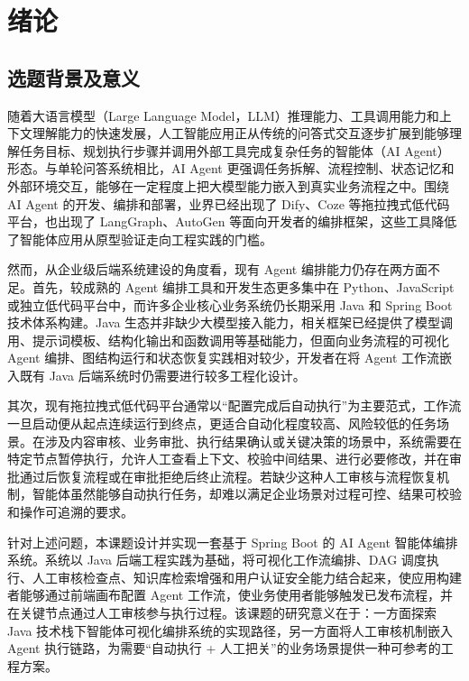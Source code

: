 
\chapter{绪论}

\section{选题背景及意义}

随着大语言模型（Large Language Model，LLM）推理能力、工具调用能力和上下文理解能力的快速发展，人工智能应用正从传统的问答式交互逐步扩展到能够理解任务目标、规划执行步骤并调用外部工具完成复杂任务的智能体（AI Agent）形态。与单轮问答系统相比，AI Agent 更强调任务拆解、流程控制、状态记忆和外部环境交互，能够在一定程度上把大模型能力嵌入到真实业务流程之中。围绕 AI Agent 的开发、编排和部署，业界已经出现了 Dify、Coze 等拖拉拽式低代码平台，也出现了 LangGraph、AutoGen 等面向开发者的编排框架，这些工具降低了智能体应用从原型验证走向工程实践的门槛。

然而，从企业级后端系统建设的角度看，现有 Agent 编排能力仍存在两方面不足。首先，较成熟的 Agent 编排工具和开发生态更多集中在 Python、JavaScript 或独立低代码平台中，而许多企业核心业务系统仍长期采用 Java 和 Spring Boot 技术体系构建。Java 生态并非缺少大模型接入能力，相关框架已经提供了模型调用、提示词模板、结构化输出和函数调用等基础能力，但面向业务流程的可视化 Agent 编排、图结构运行和状态恢复实践相对较少，开发者在将 Agent 工作流嵌入既有 Java 后端系统时仍需要进行较多工程化设计。

其次，现有拖拉拽式低代码平台通常以“配置完成后自动执行”为主要范式，工作流一旦启动便从起点连续运行到终点，更适合自动化程度较高、风险较低的任务场景。在涉及内容审核、业务审批、执行结果确认或关键决策的场景中，系统需要在特定节点暂停执行，允许人工查看上下文、校验中间结果、进行必要修改，并在审批通过后恢复流程或在审批拒绝后终止流程。若缺少这种人工审核与流程恢复机制，智能体虽然能够自动执行任务，却难以满足企业场景对过程可控、结果可校验和操作可追溯的要求。

针对上述问题，本课题设计并实现一套基于 Spring Boot 的 AI Agent 智能体编排系统。系统以 Java 后端工程实践为基础，将可视化工作流编排、DAG 调度执行、人工审核检查点、知识库检索增强和用户认证安全能力结合起来，使应用构建者能够通过前端画布配置 Agent 工作流，使业务使用者能够触发已发布流程，并在关键节点通过人工审核参与执行过程。该课题的研究意义在于：一方面探索 Java 技术栈下智能体可视化编排系统的实现路径，另一方面将人工审核机制嵌入 Agent 执行链路，为需要“自动执行 + 人工把关”的业务场景提供一种可参考的工程方案。

